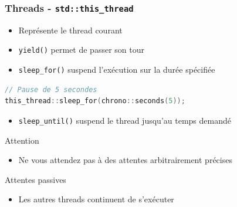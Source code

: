 \documentclass[C++.tex]{subfiles}
\begin{document}
\begin{frame}[fragile]
	\frametitle{Threads - \lstinline|std::this_thread|}
	\begin{itemize}
		\item Représente le thread courant
		\item \lstinline|yield()| permet de \og passer son tour\fg{}


		\item \lstinline|sleep_for()| suspend l'exécution sur la durée spécifiée
	\end{itemize}

	\begin{lstlisting}[language=C++]
// Pause de 5 secondes
this_thread::sleep_for(chrono::seconds(5));\end{lstlisting}

	\begin{itemize}
		\item \lstinline|sleep_until()| suspend le thread jusqu'au temps demandé
	\end{itemize}

	\begin{alertblock}{Attention}
		\begin{itemize}
			\item Ne vous attendez pas à des attentes arbitrairement précises
		\end{itemize}

	\end{alertblock}

	\begin{block}{Attentes passives}
		\begin{itemize}
			\item Les autres threads continuent de s'exécuter
		\end{itemize}
	\end{block}
\end{frame}
\end{document}
